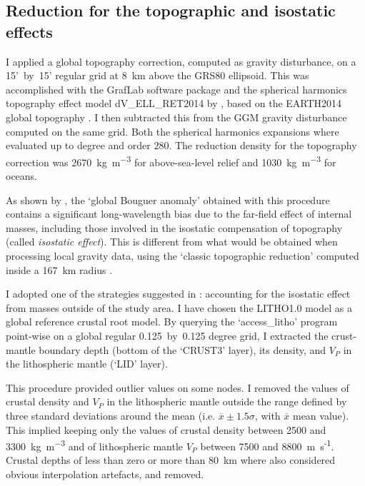 \subsection{Reduction for the topographic and isostatic effects}
\label{ss:Appl:GravTopoIso}
I applied a global topography correction, computed as gravity disturbance, on a 15'~by~15' regular grid at 8~\si{\kilo \metre} above the GRS80 ellipsoid.
This was accomplished with the GrafLab software package \parencites{bucha2013GrafLab} and the spherical harmonics topography effect model {dV\_ELL\_RET2014} by \textcite{Rexer2016}, based on the {EARTH2014} global topography \parencite{Hirt2015}.
I then subtracted this from the GGM gravity disturbance computed on the same grid.
Both the spherical harmonics expansions where evaluated up to degree and order $280$.
The reduction density for the topography correction was 2670~\si{\kilo \gram \per \cubic \metre} for above-sea-level relief and 1030~\si{\kilo \gram \per \cubic \metre} for oceans.

As shown by \textcite{Szwillus2016}, the `global Bouguer anomaly' obtained with this procedure contains a significant long-wavelength bias due to the far-field effect of internal masses, including those involved in the isostatic compensation of topography (called \textit{isostatic effect}).
This is different from what would be obtained when processing local gravity data, using the `classic topographic reduction' computed inside a 167~\si{\kilo \metre} radius \parencite{hayford1912}.

I adopted one of the strategies suggested in \textcite{Szwillus2016}: accounting for the isostatic effect from masses outside of the study area.
I have chosen the {LITHO1.0} model \parencite{Pasyanos2014} as a global reference crustal root model.
By querying the `{access\_litho}' program point-wise on a global regular {0.125}~by~{0.125} degree grid, I extracted the crust-mantle boundary depth (bottom of the `CRUST3' layer), its density, and $V_P$ in the lithospheric mantle (`LID' layer).

This procedure provided outlier values on some nodes.
I removed the values of crustal density and $V_P$ in the lithospheric mantle outside the range defined by three standard deviations around the mean (i.e. $\overline{x} \pm 1.5 \sigma $, with $\overline{x}$ mean value).
This implied keeping only the values of crustal density between 2500 and 3300~\si{\kilo \gram \per \cubic \metre} and of lithospheric mantle $V_P$ between 7500 and 8800~{m~s\textsuperscript{-1}}.
Crustal depths of less than zero or more than 80~\si{\kilo \metre} where also considered obvious interpolation artefacts, and removed.


